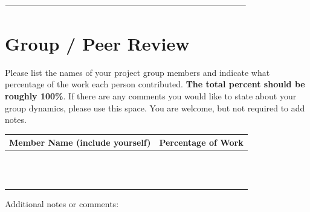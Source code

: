 \documentclass[11pt]{article}
\begin{document}
\newpage


 $\rule{10cm}{0.15mm}$

\section*{Group / Peer Review}

Please list the names of your project group members and indicate what percentage of the work each person contributed. {\bf The total percent should be roughly 100\%}. If there are any comments you would like to state about your group dynamics, please use this space.  You are welcome, but not required to add notes.



\vspace{2cm}

\begin{table}[ht!]
\centering
\begin{tabular}{l | l}
\toprule
Member Name (include yourself) & Percentage of Work \\
\midrule \\
            &                    \\ \midrule \\
            &                    \\ \midrule \\
            &                    \\ \midrule \\
            &                    \\ \midrule \\
            &                    \\ \midrule \\
            &                    \\ \midrule 
\bottomrule 
\end{tabular}
\end{table}


\vspace{2cm}

Additional notes or comments: 

\clearpage
\end{document}
